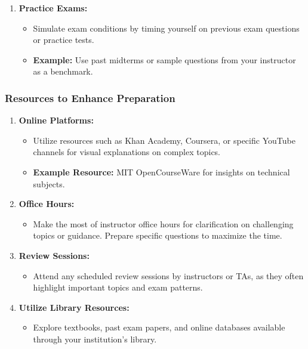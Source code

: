 \documentclass[aspectratio=169]{beamer}
\begin{document}
\begin{frame}[fragile]
\begin{enumerate}
        \item \textbf{Practice Exams:}
            \begin{itemize}
                \item Simulate exam conditions by timing yourself on previous exam questions or practice tests.
                \item \textbf{Example:} Use past midterms or sample questions from your instructor as a benchmark.
            \end{itemize}
    \end{enumerate}
\end{frame}

\begin{frame}[fragile]
    \frametitle{Resources to Enhance Preparation}
    \begin{enumerate}
        \item \textbf{Online Platforms:}
            \begin{itemize}
                \item Utilize resources such as Khan Academy, Coursera, or specific YouTube channels for visual explanations on complex topics.
                \item \textbf{Example Resource:} MIT OpenCourseWare for insights on technical subjects.
            \end{itemize}
        
        \item \textbf{Office Hours:}
            \begin{itemize}
                \item Make the most of instructor office hours for clarification on challenging topics or guidance. Prepare specific questions to maximize the time.
            \end{itemize}
        
        \item \textbf{Review Sessions:}
            \begin{itemize}
                \item Attend any scheduled review sessions by instructors or TAs, as they often highlight important topics and exam patterns.
            \end{itemize}
        
        \item \textbf{Utilize Library Resources:}
            \begin{itemize}
                \item Explore textbooks, past exam papers, and online databases available through your institution's library.
            \end{itemize}
    \end{enumerate}
\end{frame}
\end{document}
